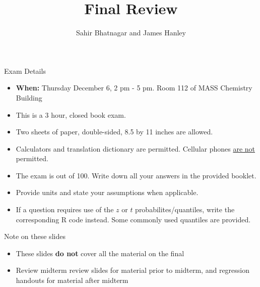 \documentclass[handout]{beamer}\usepackage[]{graphicx}\usepackage[]{color}
\begin{document}




\title{Final Review}
\subtitle{}
\author{Sahir Bhatnagar and James Hanley}


\maketitle


\begin{frame}{Exam Details}

\begin{itemize}
		\setlength\itemsep{.51em}
			\item \textbf{When:} Thursday December 6, 2 pm - 5 pm. Room 112 of MASS Chemistry Building
	\item This is a 3 hour, closed book exam. 
	\item Two sheets of paper, double-sided, 8.5 by 11 inches are allowed.
	\item Calculators and translation dictionary are permitted. Cellular phones \underline{are not} permitted. 
	\item The exam is out of 100. Write down all your answers in the provided booklet. 
	\item Provide units and state your assumptions when applicable. 
	\item If a question requires use of the $z$ or $t$ probabilites/quantiles, write the corresponding R code instead. Some commonly used quantiles are provided. 
\end{itemize}

\end{frame}

\begin{frame}{Note on these slides}
\begin{itemize}
	\setlength\itemsep{1.5em}
	\item These slides \textbf{do not} cover all the material on the final
	\item Review midterm review slides for material prior to midterm, and regression handouts for material after midterm
\end{itemize}
\end{frame}
\end{document}

